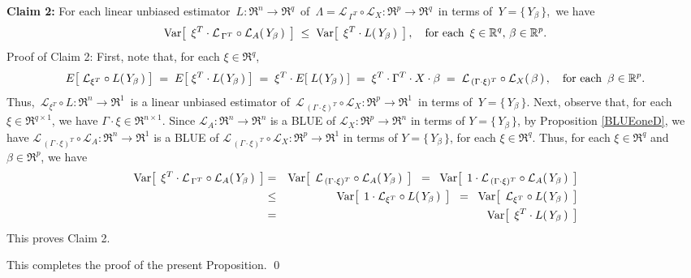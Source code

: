 \vskip 0.5cm
\noindent
\textbf{Claim 2:}\quad
For each linear unbiased estimator
\,$L : \Re^{n} \longrightarrow \Re^{q}$\,
of
\,$\Lambda = \mathcal{L}_{\,\Gamma^{T}}\circ\mathcal{L}_{X} : \Re^{p} \longrightarrow \Re^{q}$\,
in terms of
\,$Y = \{\,Y_{\beta}\,\}$,\,
we have
\begin{equation*}
\Var\!\left[\;\,\xi^{T} \cdot \mathcal{L}_{\,\Gamma^{T}} \circ \mathcal{L}_{A}(\,Y_{\beta}\,)\;\,\right]
\;\leq\;
	\Var\!\left[\;\,\xi^{T} \cdot L(\,Y_{\beta}\,)\;\,\right],
\quad
\textnormal{for each \,$\xi\in\Re^{q},\, \beta\in\Re^{p}$}.
\end{equation*}
Proof of Claim 2:\quad
First, note that, for each $\xi \in \Re^{q}$,
\begin{equation*}
E\!\left[\;\mathcal{L}_{\xi^{T}} \circ L(\,Y_{\beta}\,)\;\right]
\; = \;
	E\!\left[\;\xi^{T} \cdot L(\,Y_{\beta}\,)\;\right]
\; = \;
	\xi^{T} \cdot E\!\left[\;L(\,Y_{\beta}\,)\;\right]
\; = \;
	\xi^{T} \cdot \Gamma^{T} \cdot X \cdot \beta
\; = \;
	\mathcal{L}_{\,(\Gamma\cdot\xi)^{T}} \circ \mathcal{L}_{X}(\,\beta\,)\,,
\quad
\textnormal{for each \,$\beta\in\Re^{p}$}.
\end{equation*}
Thus,
\,$\mathcal{L}_{\xi^{T}} \circ L : \Re^{n} \longrightarrow \Re^{1}$\,
is a linear unbiased estimator of
\,$\mathcal{L}_{\,(\Gamma\cdot\xi)^{T}} \circ \mathcal{L}_{X} : \Re^{p} \longrightarrow \Re^{1}$\,
in terms of \,$Y = \{\,Y_{\beta}\,\}$.
Next, observe that, for each $\xi \in \Re^{q \times 1}$,
we have $\Gamma \cdot \xi \in \Re^{n \times 1}$.
Since $\mathcal{L}_{A} : \Re^{n} \longrightarrow \Re^{n}$
is a BLUE of
$\mathcal{L}_{X} : \Re^{p} \longrightarrow \Re^{n}$
in terms of $Y = \{\,Y_{\beta}\,\}$,
by Proposition \ref{BLUEoneD}, we have
$\mathcal{L}_{\,(\Gamma\cdot\xi)^{T}} \circ \mathcal{L}_{A} : \Re^{n} \longrightarrow \Re^{1}$
is a BLUE of 
$\mathcal{L}_{\,(\Gamma\cdot\xi)^{T}} \circ \mathcal{L}_{X} : \Re^{p} \longrightarrow \Re^{1}$
in terms of $Y = \{\,Y_{\beta}\,\}$, for each $\xi \in \Re^{q}$.
Thus, for each $\xi\in\Re^{q}$ and $\beta\in\Re^{p}$, we have
\begin{eqnarray*}
\Var\!\left[\;\,\xi^{T} \cdot \mathcal{L}_{\,\Gamma^{T}} \circ \mathcal{L}_{A}(\,Y_{\beta}\,)\;\,\right]
&=&
	\Var\!\left[\;\,\mathcal{L}_{\,(\Gamma\cdot\xi)^{T}} \circ \mathcal{L}_{A}(\,Y_{\beta}\,)\;\,\right]
\;\; = \;\;
	\Var\!\left[\;\,1 \cdot \mathcal{L}_{\,(\Gamma\cdot\xi)^{T}} \circ \mathcal{L}_{A}(\,Y_{\beta}\,)\;\,\right]
\\
& \leq &
	\Var\!\left[\;\,1 \cdot \mathcal{L}_{\xi^{T}} \circ L(\,Y_{\beta}\,)\;\,\right]
\;\; = \;\;
	\Var\!\left[\;\,\mathcal{L}_{\xi^{T}} \circ L(\,Y_{\beta}\,)\;\,\right]
\\
&=&
	\Var\!\left[\;\,\xi^{T} \cdot L(\,Y_{\beta}\,)\;\,\right]
\end{eqnarray*}
This proves Claim 2.

\vskip 0.5cm
\noindent
This completes the proof of the present Proposition.
\qed


